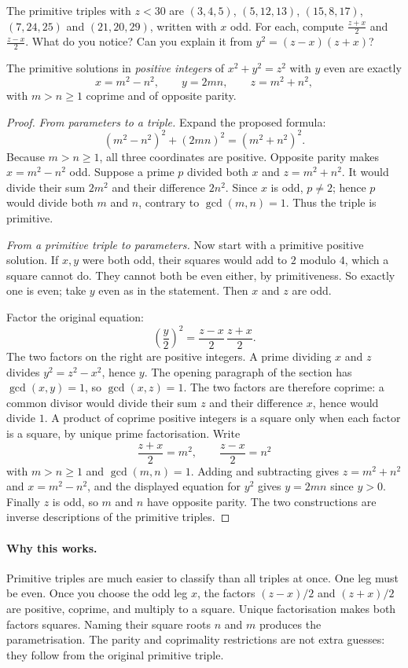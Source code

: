 \begin{think}
The primitive triples with $z<30$ are $(3,4,5)$, $(5,12,13)$, $(15,8,17)$, $(7,24,25)$ and $(21,20,29)$, written with $x$ odd. For each, compute $\frac{z+x}2$ and $\frac{z-x}2$. What do you notice? Can you explain it from $y^2=(z-x)(z+x)$?
\end{think}

\begin{theorem}\label{thm:pyth}
The primitive solutions in \emph{positive integers}
of $x^2+y^2=z^2$ with $y$ even are exactly
\[
x=m^2-n^2,\qquad y=2mn,\qquad z=m^2+n^2,
\]
with $m>n\ge1$ coprime and of opposite parity.
\end{theorem}
\begin{proof}
\emph{From parameters to a triple.}
Expand the proposed formula:
\[
(m^2-n^2)^2+(2mn)^2=(m^2+n^2)^2.
\]
Because $m>n\ge1$, all three
coordinates are positive.
Opposite parity makes $x=m^2-n^2$
odd. Suppose a prime $p$ divided both
$x$ and $z=m^2+n^2$.
It would divide their sum $2m^2$
and their difference $2n^2$.
Since $x$ is odd, $p\ne2$; hence
$p$ would divide both $m$ and $n$,
contrary to $\gcd(m,n)=1$.
Thus the triple is primitive.

\emph{From a primitive triple to parameters.}
Now start with a primitive positive solution.
If $x,y$ were both odd, their squares
would add to $2$ modulo $4$, which
a square cannot do. They cannot both
be even either, by primitiveness.
So exactly one is even; take $y$ even
as in the statement. Then $x$ and
$z$ are odd.

Factor the original equation:
\[
\left(\frac y2\right)^2
=\frac{z-x}{2}\,\frac{z+x}{2}.
\]
The two factors on the right are
positive integers. A prime dividing $x$ and $z$ divides $y^2=z^2-x^2$, hence $y$. The opening paragraph of the section has $\gcd(x,y)=1$, so $\gcd(x,z)=1$. The two factors are therefore coprime: a common divisor would divide their sum $z$ and their difference $x$, hence would divide $1$.
A product of coprime positive integers
is a square only when each factor is
a square, by unique prime factorisation.
Write
\[
\frac{z+x}{2}=m^2,\qquad
\frac{z-x}{2}=n^2
\]
with $m>n\ge1$ and $\gcd(m,n)=1$.
Adding and subtracting gives
$z=m^2+n^2$ and $x=m^2-n^2$,
and the displayed equation for $y^2$
gives $y=2mn$ since $y>0$.
Finally $z$ is odd, so $m$ and $n$
have opposite parity. The two
constructions are inverse descriptions
of the primitive triples.
\end{proof}

\paragraph{Why this works.}
Primitive triples are much easier to classify than all triples at once. One leg must be even. Once you choose the odd leg $x$, the factors $(z-x)/2$ and $(z+x)/2$ are positive, coprime, and multiply to a square. Unique factorisation makes both factors squares. Naming their square roots $n$ and $m$ produces the parametrisation. The parity and coprimality restrictions are not extra guesses: they follow from the original primitive triple.

